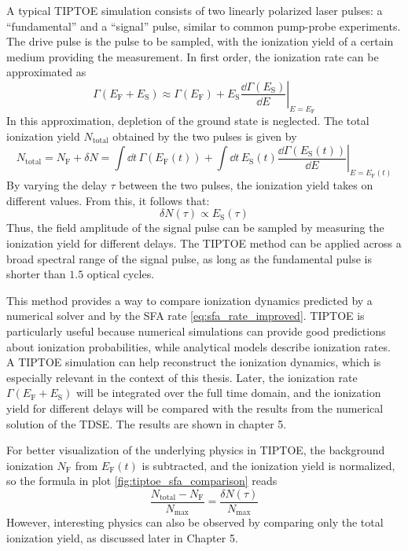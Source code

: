 A typical TIPTOE simulation consists of two linearly polarized laser pulses: a ``fundamental'' and a ``signal'' pulse, similar to common pump-probe experiments.
The drive pulse is the pulse to be sampled, with the ionization yield of a certain medium providing the measurement.
In first order, the ionization rate can be approximated as
\begin{equation}
    \Gamma(E_{\mathrm{F}}+E_{\mathrm{S}})\approx\Gamma(E_{\mathrm{F}})+\left.E_{\mathrm{S}}\frac{\dd \Gamma(E_{\mathrm{S}})}{\dd E}\right|_{E=E_{\mathrm{F}}}
\end{equation}
In this approximation, depletion of the ground state is neglected.
The total ionization yield $N_{\mathrm{total}}$ obtained by the two pulses is given by
\begin{equation*}
    N_{\mathrm{total}}=N_{\mathrm{F}}+\delta N = \int \dd t\,\Gamma(E_{\mathrm{F}}(t))+\int \dd t\,E_{\mathrm{S}}(t)\left.\frac{\dd \Gamma(E_{\mathrm{S}}(t))}{\dd E}\right|_{E=E_{\mathrm{F}}(t)}
\end{equation*}
By varying the delay $\tau$ between the two pulses, the ionization yield takes on different values.
From this, it follows that:
\begin{equation}
    \delta N(\tau)\propto E_{\mathrm{S}}(\tau) \label{eq:tiptoeprop}
\end{equation}
Thus, the field amplitude of the signal pulse can be sampled by measuring the ionization yield for different delays.
The TIPTOE method can be applied across a broad spectral range of the signal pulse, as long as the fundamental pulse is shorter than $1.5$ optical cycles.

\bigskip
This method provides a way to compare ionization dynamics predicted by a numerical solver and by the SFA rate \eqref{eq:sfa_rate_improved}.
TIPTOE is particularly useful because numerical simulations can provide good predictions about ionization probabilities, while analytical models describe ionization rates.
A TIPTOE simulation can help reconstruct the ionization dynamics, which is especially relevant in the context of this thesis.
Later, the ionization rate $\Gamma(E_{\mathrm{F}}+E_{\mathrm{S}})$ will be integrated over the full time domain, and the ionization yield for different delays will be compared with the results from the numerical solution of the TDSE.
The results are shown in chapter 5.

For better visualization of the underlying physics in TIPTOE, the background ionization $N_{\mathrm{F}}$ from $E_\mathrm{F}(t)$ is subtracted, and the ionization yield is normalized, so the formula in plot \ref{fig:tiptoe_sfa_comparison} reads
\begin{equation}
    \frac{N_{\mathrm{total}}-N_{\mathrm{F}}}{N_{\mathrm{max}}}=\frac{\delta N(\tau)}{N_{\mathrm{max}}}      \label{eq:tiptoeprop_normalized}
\end{equation}
However, interesting physics can also be observed by comparing only the total ionization yield, as discussed later in Chapter 5.

